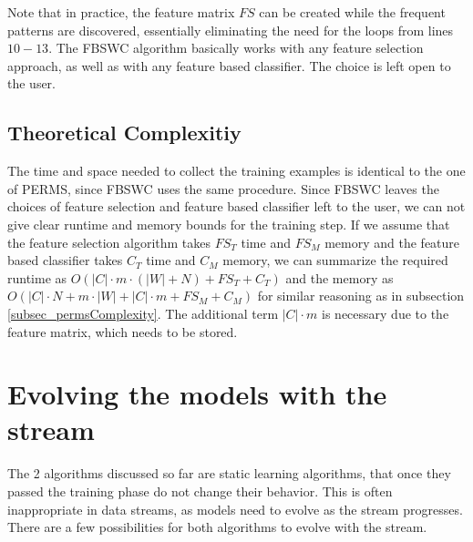 Note that in practice, the feature matrix $FS$ can be created while the frequent patterns are discovered, essentially eliminating the need for the loops from lines $10-13$. The FBSWC algorithm basically works with any feature selection approach, as well as with any feature based classifier. The choice is left open to the user.

\subsection{Theoretical Complexitiy}
The time and space needed to collect the training examples is identical to the one of PERMS, since FBSWC uses the same procedure.
Since FBSWC leaves the choices of feature selection and feature based classifier left to the user, we can not give clear runtime and memory bounds for the training step. If we assume that the feature selection algorithm takes $FS_T$ time and $FS_M$ memory and the feature based classifier takes $C_T$ time and $C_M$ memory, we can summarize the required runtime as $O(|C| \cdot m \cdot(|W| + N) + FS_T + C_T)$ and the memory as $O(|C|\cdot N + m \cdot |W| + |C|\cdot m + FS_M + C_M)$ for similar reasoning as in subsection \ref{subsec_permsComplexity}. The additional term $|C|\cdot m$ is necessary due to the feature matrix, which needs to be stored.


\section{Evolving the models with the stream}
\label{sec_EvolvingModels}

The 2 algorithms discussed so far are static learning algorithms, that once they passed the training phase do not change their behavior. This is often inappropriate in data streams, as models need to evolve as the stream progresses. There are a few possibilities for both algorithms to evolve with the stream.

